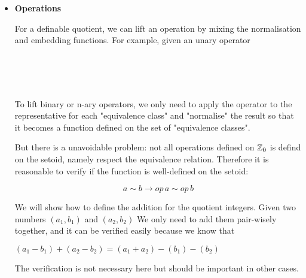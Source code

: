 \begin{itemize}
\item{\textbf{\large{Operations}}}

For a definable quotient, we can lift an operation by mixing the
normalisation and embedding functions. For example, given an unary
operator 

\begin{code}
\\
\> \AgdaSymbol{:} \AgdaSymbol{(} \AgdaSymbol{:}   \AgdaSymbol{)}    \<%
\\
\>  \AgdaSymbol{=} \AgdaFunction{[\_]}    \<%
\\
\end{code}

To lift binary or n-ary operators, we only need to apply the operator
to the representative for each "equivalence class" and "normalise" the
result so that it becomes a function defined on the set of
"equivalence classes".

But there is a unavoidable problem: not all operations defined on
$\mathbb{Z}_0$ is defind on the setoid, namely respect the equivalence
relation. Therefore it is reasonable to verify if the function is
well-defined on the setoid:

$$a \sim b → op \, a \sim op \, b$$

We will show how to define the addition for the quotient
integers. Given two numbers $(a_1 , b_1)$ and $(a_2 , b_2)$ We
only need to add them pair-wisely together, and it can be verified
easily because we know that 

$(a_1 - b_1) + (a_2 - b_2) = (a_1 + a_2) - (b_1) - (b_2)$

The verification is not necessary here but should be important in
other cases.

\begin{code}
\\
\>\AgdaFunction{\_+\_} \AgdaSymbol{:}     \<%
\\
\>\AgdaSymbol{(} \AgdaInductiveConstructor{,} \AgdaSymbol{)} \AgdaFunction{+} \AgdaSymbol{(} \AgdaInductiveConstructor{,} \AgdaSymbol{)} \AgdaSymbol{=} \AgdaSymbol{(}  \AgdaSymbol{)} \AgdaInductiveConstructor{,} \AgdaSymbol{(}  \AgdaSymbol{)}\<%
\\
\end{code}



\end{itemize}
